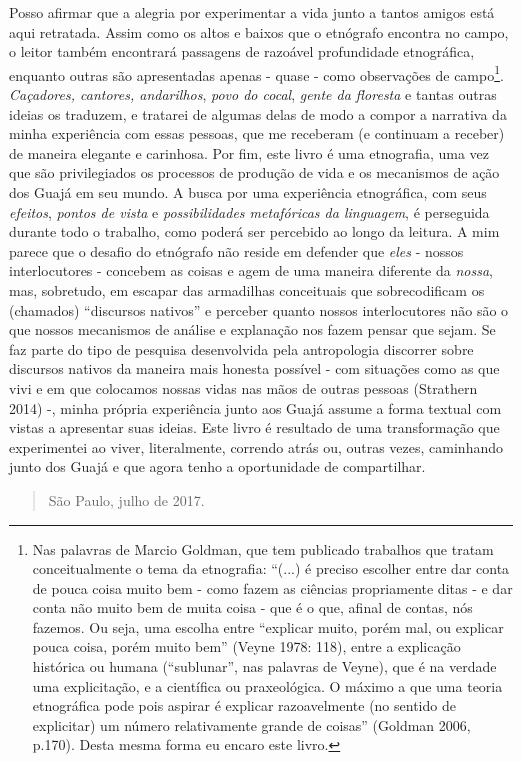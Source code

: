 Posso afirmar que a alegria por experimentar a vida junto a tantos
amigos está aqui retratada. Assim como os altos e baixos que o etnógrafo
encontra no campo, o leitor também encontrará passagens de razoável
profundidade etnográfica, enquanto outras são apresentadas apenas -
quase - como observações de campo\footnote{Nas palavras de Marcio
  Goldman, que tem publicado trabalhos que tratam conceitualmente o tema
  da etnografia: ``(...) é preciso escolher entre dar conta de pouca
  coisa muito bem - como fazem as ciências propriamente ditas - e dar
  conta não muito bem de muita coisa - que é o que, afinal de contas,
  nós fazemos. Ou seja, uma escolha entre ``explicar muito, porém mal,
  ou explicar pouca coisa, porém muito bem'' (Veyne 1978: 118), entre a
  explicação histórica ou humana (``sublunar'', nas palavras de Veyne),
  que é na verdade uma explicitação, e a científica ou praxeológica. O
  máximo a que uma teoria etnográfica pode pois aspirar é explicar
  razoavelmente (no sentido de explicitar) um número relativamente
  grande de coisas'' (Goldman 2006, p.170). Desta mesma forma eu encaro
  este livro.}. \emph{Caçadores, cantores, andarilhos}, \emph{povo do
cocal}, \emph{gente da floresta} e tantas outras ideias os traduzem, e
tratarei de algumas delas de modo a compor a narrativa da minha
experiência com essas pessoas, que me receberam (e continuam a receber)
de maneira elegante e carinhosa. Por fim, este livro é uma etnografia,
uma vez que são privilegiados os processos de produção de vida e os
mecanismos de ação dos Guajá em seu mundo. A busca por uma experiência
etnográfica, com seus \emph{efeitos}, \emph{pontos de vista} e
\emph{possibilidades metafóricas da linguagem}, é perseguida durante
todo o trabalho, como poderá ser percebido ao longo da leitura. A mim
parece que o desafio do etnógrafo não reside em defender que \emph{eles}
- nossos interlocutores - concebem as coisas e agem de uma maneira
diferente da \emph{nossa}, mas, sobretudo, em escapar das armadilhas
conceituais que sobrecodificam os (chamados) ``discursos nativos'' e
perceber quanto nossos interlocutores não são o que nossos mecanismos de
análise e explanação nos fazem pensar que sejam. Se faz parte do tipo de
pesquisa desenvolvida pela antropologia discorrer sobre discursos
nativos da maneira mais honesta possível - com situações como as que
vivi e em que colocamos nossas vidas nas mãos de outras pessoas
(Strathern 2014) -, minha própria experiência junto aos Guajá assume a
forma textual com vistas a apresentar suas ideias. Este livro é
resultado de uma transformação que experimentei ao viver, literalmente,
correndo atrás ou, outras vezes, caminhando junto dos Guajá e que agora
tenho a oportunidade de compartilhar.

\begin{quote}
São Paulo, julho de 2017.
\end{quote}
